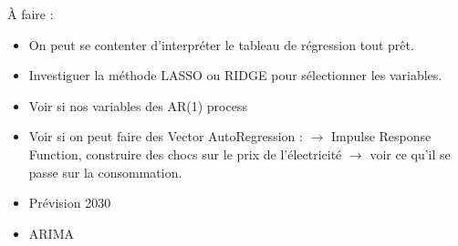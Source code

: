 
À faire : 
\begin{itemize}
\item On peut se contenter d'interpréter le tableau de régression tout prêt.
\item Investiguer la méthode LASSO ou RIDGE pour sélectionner les variables. 
\item Voir si nos variables des AR(1) process
\item Voir si on peut faire des Vector AutoRegression : $\to$ Impulse Response Function, construire des chocs sur le prix de l'électricité $\to$ voir ce qu'il se passe sur la consommation.
\item Prévision 2030
\item ARIMA
\end{itemize}

